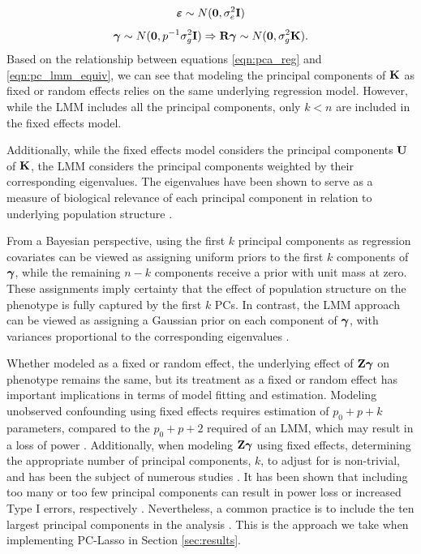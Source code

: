 $$ \boldsymbol{\varepsilon}{} \sim N(\boldsymbol{0}, \sigma^2_e \textbf{I}) $$
$$ \boldsymbol{\gamma} \sim N(\boldsymbol{0}, p^{-1} \sigma^2_g \textbf{I}) \Rightarrow \textbf{R} \boldsymbol{\gamma} \sim N(\boldsymbol{0}, \sigma^2_g \textbf{K}).$$
Based on the relationship between equations \eqref{eqn:pca_reg} and \eqref{eqn:pc_lmm_equiv}, we can see that modeling the principal components of $\textbf{K}$ as fixed or random effects relies on the same underlying regression model. However, while the LMM includes all the principal components, only $k < n$ are included in the fixed effects model. 

Additionally, while the fixed effects model considers the principal components $\textbf{U}$ of $\textbf{K}$, the LMM considers the principal components weighted by their corresponding eigenvalues. The eigenvalues have been shown to serve as a measure of biological relevance of each principal component in relation to underlying population structure \citep{hoffman2013correcting, price2006principal}. 

From a Bayesian perspective, using the first $k$ principal components as regression covariates can be viewed as assigning uniform priors to the first $k$ components of $\boldsymbol{\gamma}$, while the remaining $n - k$ components receive a prior with unit mass at zero. These assignments imply certainty that the effect of population structure on the phenotype is fully captured by the first $k$ PCs. In contrast, the LMM approach can be viewed as assigning a Gaussian prior on each component of $\boldsymbol{\gamma}$, with variances proportional to the corresponding eigenvalues \citep{astle2009population}. 

Whether modeled as a fixed or random effect, the underlying effect of $\textbf{Z} \boldsymbol{\gamma}$ on phenotype remains the same, but its treatment as a fixed or random effect has important implications in terms of model fitting and estimation. Modeling unobserved confounding using fixed effects requires estimation of $p_0 + p + k$ parameters, compared to the $p_0 + p + 2$ required of an LMM, which may result in a loss of power \citep{zhang2015principal}. Additionally, when modeling $\textbf{Z} \boldsymbol{\gamma}$ using fixed effects, determining the appropriate number of principal components, $k$, to adjust for is non-trivial, and has been the subject of numerous studies \citep{patterson2006population, zhao2018practical}. It has been shown that including too many or too few principal components can result in power loss or increased Type I errors, respectively \citep{zhang2015principal}. Nevertheless, a common practice is to include the ten largest principal components in the analysis \citep{zhao2018practical}. This is the approach we take when implementing PC-Lasso in Section \ref{sec:results}.


